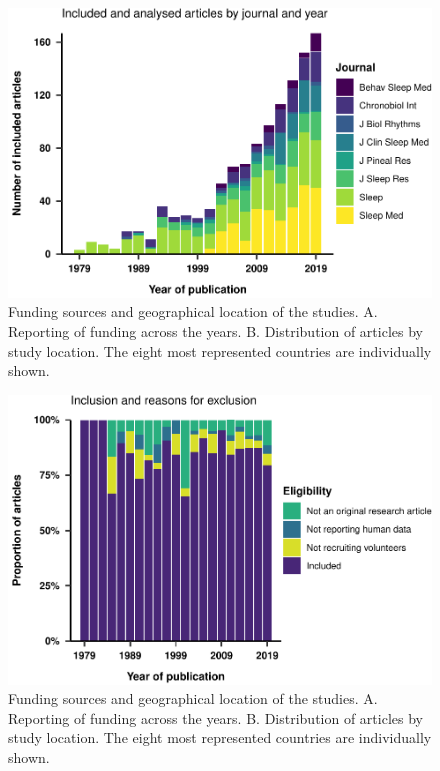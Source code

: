 \documentclass[
  english,
  jou,floatsintext]{apa6}
\begin{document}
\begin{figure}
\centering
\includegraphics{article_files/figure-latex/unnamed-chunk-1-1.pdf}
\caption{\label{fig:unnamed-chunk-1}Funding sources and geographical location of the studies. A. Reporting of funding across the years. B. Distribution of articles by study location. The eight most represented countries are individually shown.}
\end{figure}

\begin{figure}
\centering
\includegraphics{article_files/figure-latex/unnamed-chunk-2-1.pdf}
\caption{\label{fig:unnamed-chunk-2}Funding sources and geographical location of the studies. A. Reporting of funding across the years. B. Distribution of articles by study location. The eight most represented countries are individually shown.}
\end{figure}
\end{document}
